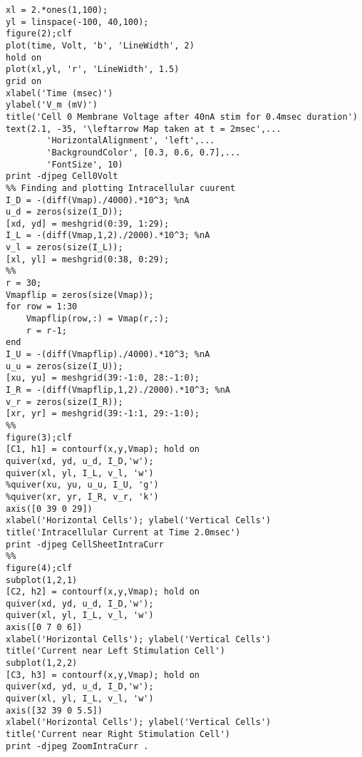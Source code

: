 \documentclass[10pt, titlepage]{article}
\begin{document}
{\begin{lstlisting}[caption={\tt Bootwala\_Report2\_maker.m}]
%%
xl = 2.*ones(1,100);
yl = linspace(-100, 40,100);
figure(2);clf
plot(time, Volt, 'b', 'LineWidth', 2)
hold on
plot(xl,yl, 'r', 'LineWidth', 1.5)
grid on
xlabel('Time (msec)')
ylabel('V_m (mV)')
title('Cell 0 Membrane Voltage after 40nA stim for 0.4msec duration')
text(2.1, -35, '\leftarrow Map taken at t = 2msec',...
        'HorizontalAlignment', 'left',...
        'BackgroundColor', [0.3, 0.6, 0.7],...
        'FontSize', 10)
print -djpeg Cell0Volt
%% Finding and plotting Intracellular cuurent
I_D = -(diff(Vmap)./4000).*10^3; %nA
u_d = zeros(size(I_D));
[xd, yd] = meshgrid(0:39, 1:29);
I_L = -(diff(Vmap,1,2)./2000).*10^3; %nA
v_l = zeros(size(I_L));
[xl, yl] = meshgrid(0:38, 0:29);
%%
r = 30;
Vmapflip = zeros(size(Vmap));
for row = 1:30
    Vmapflip(row,:) = Vmap(r,:);
    r = r-1;
end
I_U = -(diff(Vmapflip)./4000).*10^3; %nA
u_u = zeros(size(I_U));
[xu, yu] = meshgrid(39:-1:0, 28:-1:0);
I_R = -(diff(Vmapflip,1,2)./2000).*10^3; %nA
v_r = zeros(size(I_R));
[xr, yr] = meshgrid(39:-1:1, 29:-1:0);
%%
figure(3);clf
[C1, h1] = contourf(x,y,Vmap); hold on
quiver(xd, yd, u_d, I_D,'w');
quiver(xl, yl, I_L, v_l, 'w')
%quiver(xu, yu, u_u, I_U, 'g')
%quiver(xr, yr, I_R, v_r, 'k')
axis([0 39 0 29])
xlabel('Horizontal Cells'); ylabel('Vertical Cells')
title('Intracellular Current at Time 2.0msec')
print -djpeg CellSheetIntraCurr
%%
figure(4);clf
subplot(1,2,1)
[C2, h2] = contourf(x,y,Vmap); hold on
quiver(xd, yd, u_d, I_D,'w');
quiver(xl, yl, I_L, v_l, 'w')
axis([0 7 0 6])
xlabel('Horizontal Cells'); ylabel('Vertical Cells')
title('Current near Left Stimulation Cell')
subplot(1,2,2)
[C3, h3] = contourf(x,y,Vmap); hold on
quiver(xd, yd, u_d, I_D,'w');
quiver(xl, yl, I_L, v_l, 'w')
axis([32 39 0 5.5])
xlabel('Horizontal Cells'); ylabel('Vertical Cells')
title('Current near Right Stimulation Cell')
print -djpeg ZoomIntraCurr .
\end{lstlisting}
}
\vspace{0.5cm}
\end{document}
